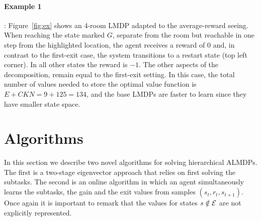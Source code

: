   \paragraph{Example 1}: Figure~\ref{fig:ex} shows an 4-room LMDP adapted to the average-reward seeing. When reaching the state marked $G$, separate from the room but reachable in one step from the highlighted location, the agent receives a reward of $0$ and, in contrast to the first-exit case, the system transitions to a restart state (top left corner). In all other states the reward is $-1$. The other aspects of the decomposition, remain equal to the first-exit setting. %
    In this case, the total number of values needed to store the optimal value function is $E+CKN=9+125=134$, and the base LMDPs are faster to learn since they have smaller state space.


\section{Algorithms}
In this section we describe two novel algorithms for solving hierarchical ALMDPs. The first is a two-stage eigenvector approach that relies on first solving the subtasks. The second is an online algorithm in which an agent simultaneously learns the subtasks, the gain and the exit values from samples $(s_t, r_t, s_{t+1})$.
Once again it is important to remark that the values for states $s\notin\mathcal{E}$ are not explicitly represented.

